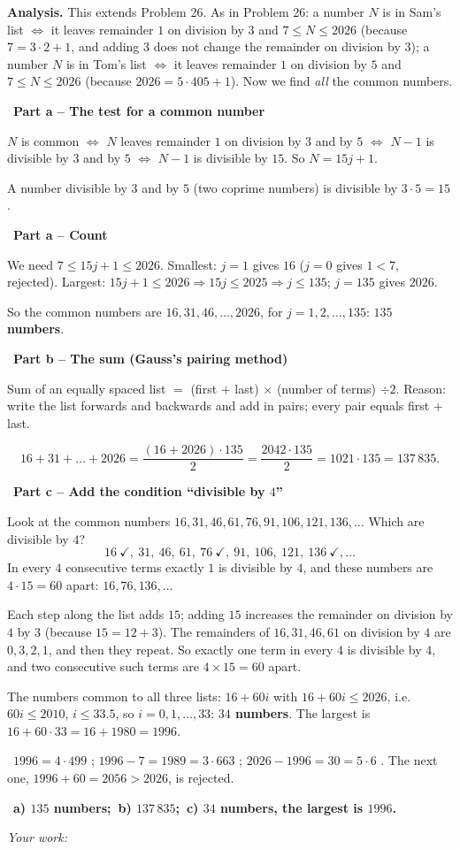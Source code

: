 \documentclass[11pt]{article}
\newif\ifsol \solfalse
\providecommand{\AnsWord}{Đáp số}
\newcommand{\StuProb}[2]{\begin{probboxS}{#1}{#2}\StuProbBody\end{probboxS}}
\newcommand{\ans}[1]{\par\smallskip{\bfseries\color{tmGreen!88!black}\AnsWord:}\ {\bfseries\color{AnsRed}#1}\par}
\newcommand{\probsol}[1]{%
  \begin{lrbox}{\solmeasure}\begin{minipage}{\dimexpr\linewidth-24pt\relax}#1\end{minipage}\end{lrbox}%
  \ifsol
    \begin{solbox}#1\end{solbox}%
  \else
    \setlength{\solht}{\dimexpr\ht\solmeasure+\dp\solmeasure+0.85cm\relax}%
    \ifdim\solht<1.35cm\setlength{\solht}{1.35cm}\fi
    \ifdim\solht>\StudentMaxWork\setlength{\solht}{\StudentMaxWork}\fi
    \par\noindent\begin{minipage}{\linewidth}%
    \expandafter\StuProb\StuProbArgs
    \begin{tcolorbox}[colback=white,colframe=Line,boxrule=0.8pt,arc=5pt,
      left=8pt,right=8pt,top=4pt,bottom=4pt,height=\solht]{\footnotesize\color{Slate}\itshape\WorkWord}\end{tcolorbox}%
    \end{minipage}\par\medskip
  \fi}
\newlength{\StudentMaxWork}\setlength{\StudentMaxWork}{4.5cm}
\newcommand{\step}[2]{\par\smallskip\noindent{\bfseries\color{tmBlue!85!black}\StepWord~#1.}\ {\bfseries #2}\par\nopagebreak}
\newcommand{\verify}[1]{\par\smallskip\noindent{\bfseries\color{tmGreen!80!black}\faCheckCircle\ \CheckWord}\ #1\par}
\def\WorkWord{Your work:}
\def\AnsWord{Answer}
\def\StepWord{Step}
\def\CheckWord{Check:}
\begin{document}
\probsol{
\textbf{Analysis.} This extends Problem 26. As in Problem 26: a number $N$ is in Sam's list $\iff$ it leaves remainder $1$ on division by $3$ and $7\le N\le 2026$ (because $7=3\cdot 2+1$, and adding $3$ does not change the remainder on division by $3$); a number $N$ is in Tom's list $\iff$ it leaves remainder $1$ on division by $5$ and $7\le N\le 2026$ (because $2026=5\cdot 405+1$). Now we find \emph{all} the common numbers.

\step{1}{Part a -- The test for a common number}
$N$ is common $\iff$ $N$ leaves remainder $1$ on division by $3$ and by $5$ $\iff$ $N-1$ is divisible by $3$ and by $5$ $\iff$ $N-1$ is divisible by $15$. So $N=15j+1$.
\begin{recallbox}A number divisible by $3$ and by $5$ (two coprime numbers) is divisible by $3\cdot 5=15$.\end{recallbox}

\step{2}{Part a -- Count}
We need $7\le 15j+1\le 2026$. Smallest: $j=1$ gives $16$ ($j=0$ gives $1<7$, rejected). Largest: $15j+1\le 2026 \Rightarrow 15j\le 2025 \Rightarrow j\le 135$; $j=135$ gives $2026$.\par
So the common numbers are $16, 31, 46,\dots, 2026$, for $j=1,2,\dots,135$: \textbf{$135$ numbers}.

\step{3}{Part b -- The sum (Gauss's pairing method)}
\begin{recallbox}Sum of an equally spaced list $=$ (first $+$ last) $\times$ (number of terms) $\div 2$. Reason: write the list forwards and backwards and add in pairs; every pair equals first $+$ last.\end{recallbox}
\[ 16+31+\dots+2026=\frac{(16+2026)\cdot 135}{2}=\frac{2042\cdot 135}{2}=1021\cdot 135=137\,835. \]

\step{4}{Part c -- Add the condition ``divisible by $4$''}
Look at the common numbers $16, 31, 46, 61, 76, 91, 106, 121, 136,\dots$ Which are divisible by $4$?
\[ 16\ \checkmark,\ 31,\ 46,\ 61,\ 76\ \checkmark,\ 91,\ 106,\ 121,\ 136\ \checkmark,\dots \]
In every $4$ consecutive terms exactly $1$ is divisible by $4$, and these numbers are $4\cdot 15=60$ apart: $16, 76, 136, \dots$
\begin{proofbox}Each step along the list adds $15$; adding $15$ increases the remainder on division by $4$ by $3$ (because $15=12+3$). The remainders of $16,31,46,61$ on division by $4$ are $0,3,2,1$, and then they repeat. So exactly one term in every $4$ is divisible by $4$, and two consecutive such terms are $4\times15=60$ apart.\end{proofbox}
The numbers common to all three lists: $16+60i$ with $16+60i\le 2026$, i.e.\ $60i\le 2010$, $i\le 33.5$, so $i=0,1,\dots,33$: \textbf{$34$ numbers}. The largest is $16+60\cdot 33=16+1980=1996$.
\verify{$1996=4\cdot 499$ \checkmark; $1996-7=1989=3\cdot 663$ \checkmark; $2026-1996=30=5\cdot 6$ \checkmark. The next one, $1996+60=2056>2026$, is rejected.}
\ans{a) $135$ numbers;\ b) $137\,835$;\ c) $34$ numbers, the largest is $1996$.}
}
\end{document}
